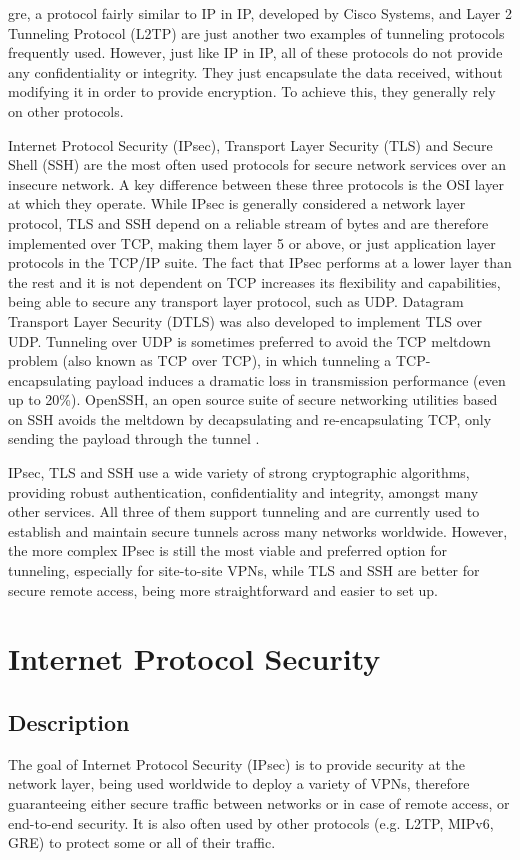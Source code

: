 \documentclass[a4paper,12pt]{report}
\begin{document}
		\acrfull{gre}, a protocol fairly similar to IP in IP, developed by Cisco Systems, and Layer 2 Tunneling Protocol (L2TP) are just another two examples of tunneling protocols frequently used. However, just like IP in IP, all of these protocols do not provide any confidentiality or integrity. They just encapsulate the data received, without modifying it in order to provide encryption. To achieve this, they generally rely on other protocols.
		
		Internet Protocol Security (IPsec), Transport Layer Security (TLS) and Secure Shell (SSH) are the most often used protocols for secure network services over an insecure network. A key difference between these three protocols is the OSI layer at which they operate. While IPsec is generally considered a network layer protocol, TLS and SSH depend on a reliable stream of bytes and are therefore implemented over TCP, making them layer 5 or above, or just application layer protocols in the TCP/IP suite. The fact that IPsec performs at a lower layer than the rest and it is not dependent on TCP increases its flexibility and capabilities, being able to secure any transport layer protocol, such as UDP. Datagram Transport Layer Security (DTLS) was also developed to implement TLS over UDP. Tunneling over UDP is sometimes preferred to avoid the TCP meltdown problem (also known as TCP over TCP), in which tunneling a TCP-encapsulating payload induces a dramatic loss in transmission performance (even up to 20\%)\cite{tcpmeltdown}. OpenSSH, an open source suite of secure networking utilities based on SSH avoids the meltdown by decapsulating and re-encapsulating TCP, only sending the payload through the tunnel \cite{opensshmeltdown}.
		
		IPsec, TLS and SSH use a wide variety of strong cryptographic algorithms, providing robust authentication, confidentiality and integrity, amongst many other services. All three of them support tunneling and are currently used to establish and maintain secure tunnels across many networks worldwide. However, the more complex IPsec is still the most viable and preferred option for tunneling, especially for site-to-site VPNs, while TLS and SSH are better for secure remote access, being more straightforward and easier to set up.
		
	\chapter{Internet Protocol Security}
	\section{Description }
		The goal of Internet Protocol Security (IPsec) is to provide security at the network layer, being used worldwide to deploy a variety of VPNs, therefore guaranteeing either secure traffic between networks or in case of remote access, or end-to-end security. It is also often used by other protocols (e.g. L2TP, MIPv6, GRE) to protect some or all of their traffic.
		
\end{document}
